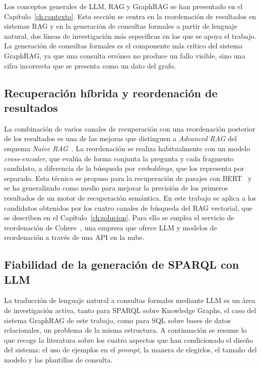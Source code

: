 \documentclass[11pt, a4paper]{report}
\begin{document}
	Los conceptos generales de LLM, RAG y GraphRAG se han presentado en el
	Capítulo~\ref{ch:contexto}. Esta sección se centra en la reordenación
	de resultados en sistemas RAG y en la generación de consultas formales a partir de lenguaje natural,
	dos líneas de investigación más específicas en las que se apoya el trabajo. La generación de consultas formales es el componente más crítico del sistema
	GraphRAG, ya que una consulta errónea no produce un fallo visible, sino una
	cifra incorrecta que se presenta como un dato del grafo.

	\subsection{Recuperación híbrida y reordenación de resultados}

	La combinación de varios canales de recuperación con una reordenación
	posterior de los resultados es una de las mejoras que distinguen a
	\textit{Advanced RAG} del esquema \textit{Naive
	RAG}~\cite{gao2023-rag-survey}. La reordenación se realiza habitualmente con
	un modelo \textit{cross-encoder}, que evalúa de forma conjunta la pregunta y
	cada fragmento candidato, a diferencia de la búsqueda por \textit{embeddings},
	que los representa por separado. Esta técnica se propuso para la recuperación
	de pasajes con BERT~\cite{nogueira2019-bert-rerank} y se ha generalizado como
	medio para mejorar la precisión de los primeros resultados de un motor de
	recuperación semántica. En este trabajo se aplica a los candidatos obtenidos
	por los cuatro canales de búsqueda del RAG vectorial, que se describen en el
	Capítulo~\ref{ch:solucion}. Para ello se emplea el servicio de reordenación de
	Cohere~\cite{cohere-rerank}, una empresa que ofrece LLM y modelos de
	reordenación a través de una API en la nube.

	\subsection{Fiabilidad de la generación de SPARQL con LLM}
	\label{sec:estado-arte-sparql}

	La traducción de lenguaje natural a consultas formales mediante LLM es un área
	de investigación activa, tanto para SPARQL sobre Knowledge Graphs, el
	caso del sistema GraphRAG de este trabajo, como para SQL sobre bases de datos
	relacionales, un problema de la misma estructura. A continuación se
	resume lo que recoge la literatura sobre los cuatro aspectos que han
	condicionado el diseño del sistema: el uso de ejemplos en el
	\textit{prompt}, la manera de elegirlos, el tamaño del modelo y las
	plantillas de consulta.
\end{document}
